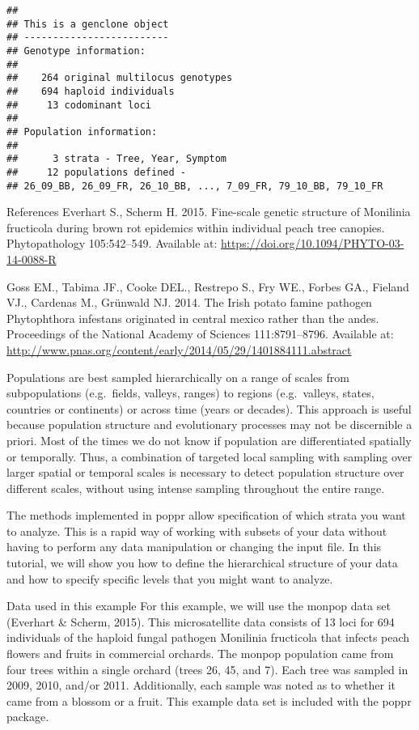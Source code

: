 \documentclass[12pt,]{krantz}
\theoremstyle{definition}
\theoremstyle{definition}
\theoremstyle{definition}
\theoremstyle{remark}
\begin{document}
\begin{verbatim}
## 
## This is a genclone object
## -------------------------
## Genotype information:
## 
##    264 original multilocus genotypes 
##    694 haploid individuals
##     13 codominant loci
## 
## Population information:
## 
##      3 strata - Tree, Year, Symptom
##     12 populations defined - 
## 26_09_BB, 26_09_FR, 26_10_BB, ..., 7_09_FR, 79_10_BB, 79_10_FR
\end{verbatim}

References Everhart S., Scherm H. 2015. Fine-scale genetic structure of
Monilinia fructicola during brown rot epidemics within individual peach
tree canopies. Phytopathology 105:542--549. Available at:
\url{https://doi.org/10.1094/PHYTO-03-14-0088-R}

Goss EM., Tabima JF., Cooke DEL., Restrepo S., Fry WE., Forbes GA.,
Fieland VJ., Cardenas M., Grünwald NJ. 2014. The Irish potato famine
pathogen Phytophthora infestans originated in central mexico rather than
the andes. Proceedings of the National Academy of Sciences
111:8791--8796. Available at:
\url{http://www.pnas.org/content/early/2014/05/29/1401884111.abstract}

Populations are best sampled hierarchically on a range of scales from
subpopulations (e.g.~fields, valleys, ranges) to regions (e.g.~valleys,
states, countries or continents) or across time (years or decades). This
approach is useful because population structure and evolutionary
processes may not be discernible a priori. Most of the times we do not
know if population are differentiated spatially or temporally. Thus, a
combination of targeted local sampling with sampling over larger spatial
or temporal scales is necessary to detect population structure over
different scales, without using intense sampling throughout the entire
range.

The methods implemented in poppr allow specification of which strata you
want to analyze. This is a rapid way of working with subsets of your
data without having to perform any data manipulation or changing the
input file. In this tutorial, we will show you how to define the
hierarchical structure of your data and how to specify specific levels
that you might want to analyze.

Data used in this example For this example, we will use the monpop data
set (Everhart \& Scherm, 2015). This microsatellite data consists of 13
loci for 694 individuals of the haploid fungal pathogen Monilinia
fructicola that infects peach flowers and fruits in commercial orchards.
The monpop population came from four trees within a single orchard
(trees 26, 45, and 7). Each tree was sampled in 2009, 2010, and/or 2011.
Additionally, each sample was noted as to whether it came from a blossom
or a fruit. This example data set is included with the poppr package.
\end{document}
